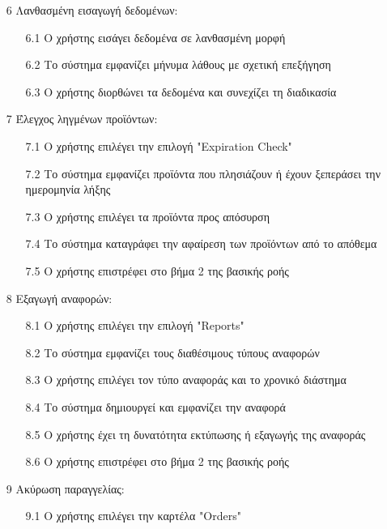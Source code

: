 \documentclass[12pt,a4paper,twoside]{book}
\begin{document}
\begin{enumerate}
\begin{enumerate}
        \end{enumerate}
  \item[6 ] Λανθασμένη εισαγωγή δεδομένων:
        \begin{enumerate}
          \item [6.1 ] Ο χρήστης εισάγει δεδομένα σε λανθασμένη μορφή %
          \item [6.2 ] Το σύστημα εμφανίζει μήνυμα λάθους με σχετική επεξήγηση
          \item [6.3 ] Ο χρήστης διορθώνει τα δεδομένα και συνεχίζει τη διαδικασία
        \end{enumerate}
  \item[7 ] Έλεγχος ληγμένων προϊόντων:
        \begin{enumerate}
          \item [7.1 ] Ο χρήστης επιλέγει την επιλογή "Expiration Check"
          \item [7.2 ] Το σύστημα εμφανίζει προϊόντα που πλησιάζουν ή έχουν ξεπεράσει την ημερομηνία λήξης
          \item [7.3 ] Ο χρήστης επιλέγει τα προϊόντα προς απόσυρση
          \item [7.4 ] Το σύστημα καταγράφει την αφαίρεση των προϊόντων από το απόθεμα
          \item [7.5 ] Ο χρήστης επιστρέφει στο βήμα 2 της βασικής ροής
        \end{enumerate}
  \item[8 ] Εξαγωγή αναφορών:
        \begin{enumerate}
          \item [8.1 ] Ο χρήστης επιλέγει την επιλογή "Reports"
          \item [8.2 ] Το σύστημα εμφανίζει τους διαθέσιμους τύπους αναφορών %
          \item [8.3 ] Ο χρήστης επιλέγει τον τύπο αναφοράς και το χρονικό διάστημα
          \item [8.4 ] Το σύστημα δημιουργεί και εμφανίζει την αναφορά
          \item [8.5 ] Ο χρήστης έχει τη δυνατότητα εκτύπωσης ή εξαγωγής της αναφοράς
          \item [8.6 ] Ο χρήστης επιστρέφει στο βήμα 2 της βασικής ροής
        \end{enumerate}
  \item[9 ] Ακύρωση παραγγελίας:
        \begin{enumerate}
          \item [9.1 ] Ο χρήστης επιλέγει την καρτέλα "Orders"

\end{enumerate}
\end{enumerate}
\end{document}
